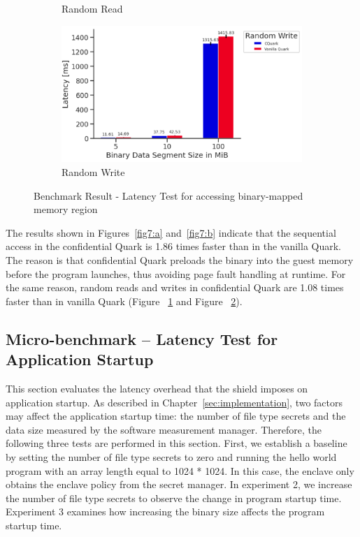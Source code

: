 \begin{figure}[!htb]
\begin{subfigure}[b]{0.5\linewidth}
      \caption{Random Read} 
      \label{fig7:c} 
    \end{subfigure}%
    \begin{subfigure}[b]{0.5\linewidth}
      \centering
      \includegraphics[width=0.9\linewidth]{images/Random_Write.PNG} 
      \caption{Random Write} 
      \label{fig7:d} 
    \end{subfigure} 
    \caption{Benchmark Result - Latency Test for accessing binary-mapped memory region}
    \label{fig7} 
\end{figure}



The results shown in Figures~\ref{fig7:a} and~\ref{fig7:b} indicate that the sequential access in the confidential Quark is 1.86 times faster than in the vanilla Quark. The reason is that confidential Quark preloads the binary into the guest memory before the program launches, thus avoiding page fault handling at 
runtime. For the same reason, random reads and writes in confidential Quark are 1.08 times faster than in vanilla Quark (Figure ~\ref{fig7:c} and Figure ~\ref{fig7:d}).


\subsection{Micro-benchmark – Latency Test for Application Startup}\label{micro_app_start_up}

This section evaluates the latency overhead that the shield imposes on application startup. As described in Chapter~\ref{sec:implementation}, two factors may affect the application startup time: the number of file type secrets and the data size measured by the software measurement manager. Therefore, 
the following three tests are performed in this section. First, we establish a baseline by setting the number of file type secrets to zero and running the hello world program with an array length equal to 1024 * 1024. In this case, the enclave only obtains the enclave policy from the secret manager. In experiment 2, we increase the number of 
file type secrets to observe the change in program startup time. Experiment 3 examines how increasing the binary size affects the program startup time.


